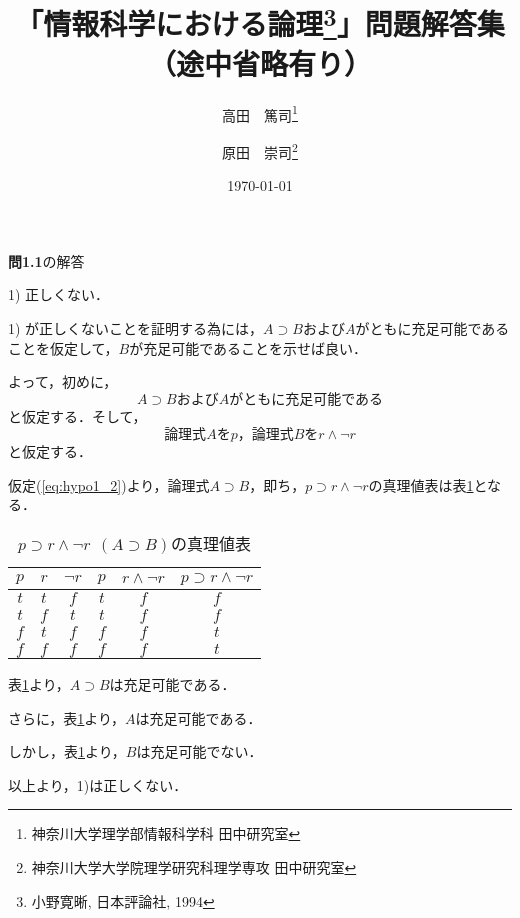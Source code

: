 \documentclass[11pt,dvipdfmx]{jreport}
\title{「情報科学における論理\footnote{小野寛晰, 日本評論社, 1994}」問題解答集（途中省略有り）}
\author{高田　篤司\thanks{神奈川大学理学部情報科学科 田中研究室} \and 原田　崇司\thanks{神奈川大学大学院理学研究科理学専攻 田中研究室}}
\date{\today}
\begin{document}
\maketitle

\noindent \textbf{問1.1}の解答
\par
1) 正しくない．
\par
1) が正しくないことを証明する為には，$A \supset B$および$A$がともに充足可能であることを仮定して，$B$が充足可能であることを示せば良い．
\par
よって，初めに，
\begin{equation}
 \textrm{$A \supset B$および$A$がともに充足可能である}
 \label{eq:hypo1_1}
\end{equation}
と仮定する．そして，
\begin{equation}
 \textrm{論理式$A$を$p$，論理式$B$を$r \land \lnot r$}
 \label{eq:hypo1_2}
\end{equation}
と仮定する．
\par
仮定(\ref{eq:hypo1_2})より，論理式$A \supset B$，即ち，$p \supset r \land \lnot r$の真理値表は表\ref{tb:AimpB}となる．
\begin{table}[!htbp]
 \centering
   \caption{$p \supset r \land \lnot r \ \ (A \supset B)$の真理値表}
   \vspace{3mm}
   \begin{tabular}{c|c|c|c|c|c}
    $p$ & $r$ & $\lnot r$ & $p$ & $r \land \lnot r$ & $p \supset r \land \lnot r$ \\ \hline
    $t$ & $t$ & $f$       & $t$       & $f$                     & $f$ \\ \hline
    $t$ & $f$ & $t$       & $t$       & $f$                     & $f$ \\ \hline
    $f$ & $t$ & $f$       & $f$       & $f$                     & $t$ \\ \hline
    $f$ & $f$ & $f$       & $f$       & $f$                     & $t$ 
   \end{tabular}
   \label{tb:AimpB}
\end{table}

表\ref{tb:AimpB}より，$A \supset B$は充足可能である．
\par
さらに，表\ref{tb:AimpB}より，$A$は充足可能である．
\par
しかし，表\ref{tb:AimpB}より，$B$は充足可能でない．
\par
以上より，1)は正しくない．
\end{document}

